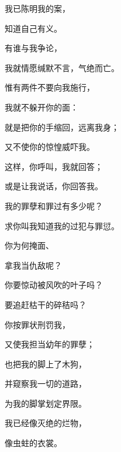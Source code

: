 {\par }{\Q {}我已陈明我的案，
\par }{\Q 知道自己有义。
\par }{\Q {}有谁与我争论，
\par }{\Q 我就情愿缄默不言，气绝而亡。
\par }{\Q {}惟有两件不要向我施行，
\par }{\Q 我就不躲开你的面：
\par }{\Q {}就是把你的手缩回，远离我身；
\par }{\Q 又不使你的惊惶威吓我。
\par }{\Q {}这样，你呼叫，我就回答；
\par }{\Q 或是让我说话，你回答我。
\par }{\Q {}我的罪孽和罪过有多少呢？
\par }{\Q 求你叫我知道我的过犯与罪愆。
\par }{\Q {}你为何掩面、
\par }{\Q 拿我当仇敌呢？
\par }{\Q {}你要惊动被风吹的叶子吗？
\par }{\Q 要追赶枯干的碎秸吗？
\par }{\Q {}你按罪状刑罚我，
\par }{\Q 又使我担当幼年的罪孽；
\par }{\Q {}也把我的脚上了木狗，
\par }{\Q 并窥察我一切的道路，
\par }{\Q 为我的脚掌划定界限。
\par }{\Q {}我已经像灭绝的烂物，
\par }{\Q 像虫蛀的衣裳。

}
